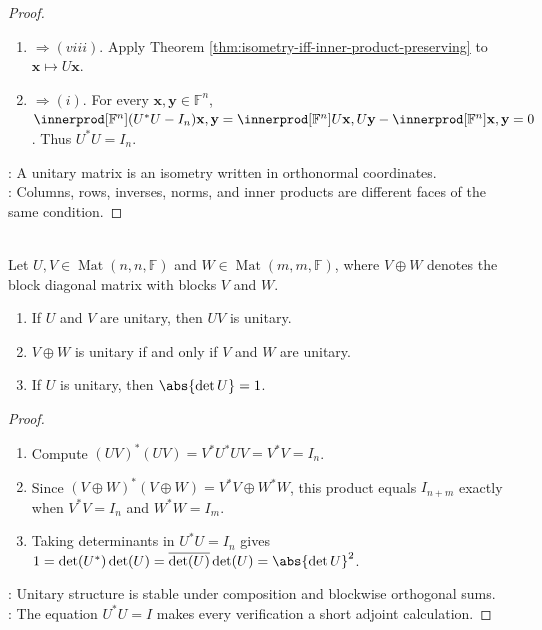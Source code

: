 \begin{theorem}
\begin{proof}
\begin{enumerate}[label=(\roman*).]
\item[$(vii)$]$\Rightarrow (viii)$. Apply Theorem \ref{thm:isometry-iff-inner-product-preserving} to $\mathbf{x}\mapsto U\mathbf{x}$.
\item[$(viii)$]$\Rightarrow (i)$. For every $\mathbf{x},\mathbf{y}\in\mathbb{F}^n$, $\innerprod[\mathbb{F}^n]{(U^*U-I_n)\mathbf{x},\mathbf{y}} =\innerprod[\mathbb{F}^n]{U\mathbf{x},U\mathbf{y}}-\innerprod[\mathbb{F}^n]{\mathbf{x},\mathbf{y}} =0$. Thus $U^*U=I_n$.
\end{enumerate}
: A unitary matrix is an isometry written in orthonormal coordinates.\\
: Columns, rows, inverses, norms, and inner products are different faces of the same condition.
\end{proof}
\end{theorem}

\begin{proposition} \label{prop:algebra-of-unitary-matrices} \\
Let $U,V\in\operatorname{Mat}(n,n,\mathbb{F})$ and $W\in\operatorname{Mat}(m,m,\mathbb{F})$, where $V\oplus W$ denotes the block diagonal matrix with blocks $V$ and $W$.
\begin{enumerate}[label=\roman*.]
\setlength{\itemsep}{0pt}
\item If $U$ and $V$ are unitary, then $UV$ is unitary.
\item $V\oplus W$ is unitary if and only if $V$ and $W$ are unitary.
\item If $U$ is unitary, then $\abs{\det U}=1$.
\end{enumerate}
\begin{proof}
\begin{enumerate}[label=(\roman*)]
\setlength{\itemsep}{0pt}
\item Compute $(UV)^*(UV)=V^*U^*UV=V^*V=I_n$.
\item Since $(V\oplus W)^*(V\oplus W)=V^*V\oplus W^*W$, this product equals $I_{n+m}$ exactly when $V^*V=I_n$ and $W^*W=I_m$.
\item Taking determinants in $U^*U=I_n$ gives $1=\det(U^*)\det(U)=\overline{\det(U)}\det(U)=\abs{\det U}^2$.
\end{enumerate}
: Unitary structure is stable under composition and blockwise orthogonal sums.\\
: The equation $U^*U=I$ makes every verification a short adjoint calculation.
\end{proof}
\end{proposition}

